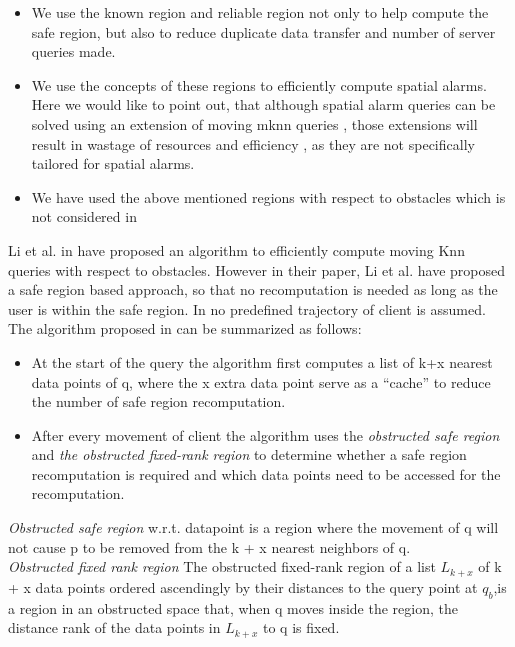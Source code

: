 \begin{itemize}
\item We use the known region and reliable region not only to help compute the safe region, but also to reduce duplicate data transfer and number of server queries made.
\item We use the concepts of these regions to efficiently compute spatial alarms. Here we would like to point out, that although spatial alarm queries can be solved using an extension of moving mknn queries , those extensions will result in wastage of resources and efficiency , as they are not specifically tailored for spatial alarms.
\item We have used the above mentioned regions with respect to obstacles which is not considered in \cite{mknn} 
\end{itemize} 
\vspace{5pt}
Li et al. in \cite{oknn} have proposed an algorithm to efficiently compute moving Knn queries with respect to obstacles.  However in their paper, Li et al. have proposed a safe region based approach, so that no recomputation is needed as long as the user is within the safe region. In \cite{oknn} no predefined trajectory of client is assumed. The algorithm proposed in \cite{oknn} can be summarized as follows:
\begin{itemize}
\item At the start of the query the algorithm first computes a  list of k+x nearest data points of q, where the x extra data point serve as a “cache” to reduce the number of safe region recomputation.
\item After every movement of client the algorithm uses the \textit{obstructed safe region} and \textit{the obstructed fixed-rank region} to determine whether a safe region recomputation is required and which data points need to be accessed for the recomputation.
\end{itemize}

\textit{Obstructed safe region} w.r.t. datapoint is  a region where the movement of q will not cause p to be removed from the k + x nearest neighbors of q.\\
\textit{Obstructed fixed rank region}  The obstructed fixed-rank region of a list
$L_{k+x}$ of k + x data points ordered ascendingly by their distances to the query point at $q_b$,is a region in an obstructed space that, when q moves inside the region, the distance rank of the data points in $L_{k+x}$ to q is fixed.\\

